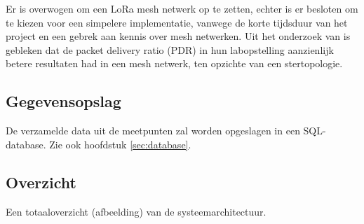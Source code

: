 Er is overwogen om een LoRa mesh netwerk op te zetten, echter is er besloten om te kiezen voor een simpelere implementatie, vanwege de korte tijdsduur van het project en een gebrek aan kennis over mesh netwerken. Uit het onderzoek van \citep{AIM_HI_LORA_WMN} is gebleken dat de packet delivery ratio (PDR) in hun labopstelling aanzienlijk betere resultaten had in een mesh netwerk, ten opzichte van een stertopologie.

\subsection{Gegevensopslag}
De verzamelde data uit de meetpunten zal worden opgeslagen in een SQL-database.
Zie ook hoofdstuk \ref{sec:database}.

\label{subsec:overzicht}
\subsection{Overzicht}
Een totaaloverzicht (afbeelding) van de systeemarchitectuur.
